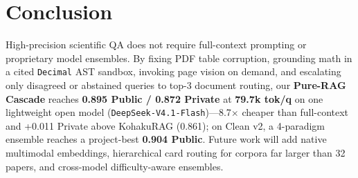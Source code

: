 \documentclass[sigconf,nonacm]{acmart}
\newcommand{\code}[1]{\texttt{\small #1}}
\begin{document}
\section{Conclusion}
\label{sec:conclusion}

High-precision scientific QA does not require full-context prompting or proprietary model ensembles. By fixing PDF table corruption, grounding math in a cited \code{Decimal} AST sandbox, invoking page vision on demand, and escalating only disagreed or abstained queries to top-3 document routing, our \textbf{Pure-RAG Cascade} reaches \textbf{0.895 Public / 0.872 Private} at \textbf{79.7k tok/q} on one lightweight open model (\code{DeepSeek-V4.1-Flash})---8.7$\times$ cheaper than full-context and +0.011 Private above KohakuRAG (0.861); on Clean v2, a 4-paradigm ensemble reaches a project-best \textbf{0.904 Public}. Future work will add native multimodal embeddings, hierarchical card routing for corpora far larger than 32 papers, and cross-model difficulty-aware ensembles.


\balance

\end{document}
